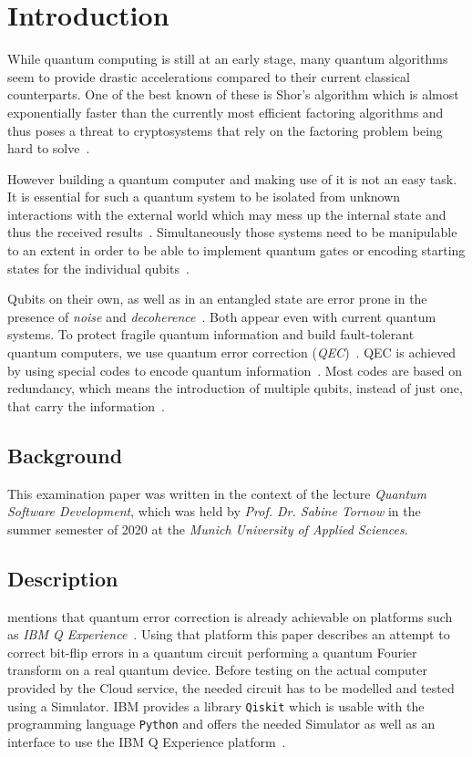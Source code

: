 \section{Introduction}
\label{sec:introduction}

While quantum computing is still at an early stage, many quantum algorithms seem to provide drastic accelerations compared to their current classical counterparts.
One of the best known of these is Shor's algorithm which is almost exponentially faster than the currently most efficient factoring algorithms and thus poses a threat to cryptosystems that rely on the factoring problem being hard to solve~\cite{Shor}.

However building a quantum computer and making use of it is not an easy task.
It is essential for such a quantum system to be isolated from unknown interactions with the external world which may mess up the internal state and thus the received results~\cite[p. 34]{Milburn}.
Simultaneously those systems need to be manipulable to an extent in order to be able to implement quantum gates or encoding starting states for the individual qubits~\cite{Matuschak2019}.

Qubits on their own, as well as in an entangled state are error prone in the presence of \emph{noise} and \emph{decoherence}~\cite[p. 34]{Milburn}.
Both appear even with current quantum systems.
To protect fragile quantum information and build fault-tolerant quantum computers, we use quantum error correction (\emph{QEC})~\cite[p. 46998]{Li}.
QEC is achieved by using special codes to encode quantum information~\cite[p. 113]{deBrito}.
Most codes are based on redundancy, which means the introduction of multiple qubits, instead of just one, that carry the information~\cite[p. 113]{deBrito}.

\subsection{Background}
\label{subsec:background}

This examination paper was written in the context of the lecture \emph{Quantum Software Development}, which was held by \emph{Prof. Dr. Sabine Tornow} in the summer semester of 2020 at the \emph{Munich University of Applied Sciences}.

\subsection{Description}

 mentions that quantum error correction is already achievable on platforms such as \emph{IBM Q Experience}~\cite{IBMQExperience}.
Using that platform this paper describes an attempt to correct bit-flip errors in a quantum circuit performing a quantum Fourier transform on a real quantum device.
Before testing on the actual computer provided by the Cloud service, the needed circuit has to be modelled and tested using a Simulator.
IBM provides a library \texttt{Qiskit} which is usable with the programming language \texttt{Python} and offers the needed Simulator as well as an interface to use the IBM Q Experience platform~\cite{Qiskit}.

